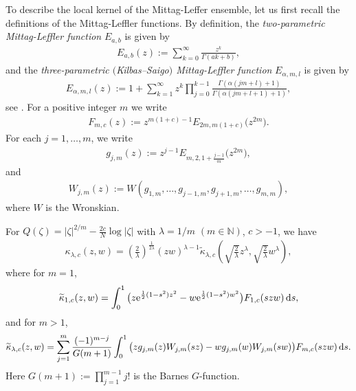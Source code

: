 To describe the local kernel of the Mittag-Leffer ensemble, let us first recall the definitions of the Mittag-Leffler functions. By definition, the \emph{two-parametric Mittag-Leffler function} $E_{a,b}$ is given by
\begin{gather} \label{ML function}
	E_{a,b}(z):=\sum_{k=0}^{\infty} \frac{z^k}{\Gamma(ak+b)},
\end{gather}
and the \emph{three-parametric $($Kilbas--Saigo$)$ Mittag-Leffler function} $E_{\alpha,m,l}$ is given by
\begin{gather} \label{ML3}
	E_{\alpha,m,l}(z):=1+\sum_{k=1}^\infty z^k \prod_{j=0}^{k-1} \frac{ \Gamma(\alpha(jm+l)+1) }{ \Gamma(\alpha(jm+l+1)+1) },
\end{gather}
see \cite[Chapters~4 and~5]{gorenflo2014mittag}.
For a positive integer $m$ we write
\begin{gather}\label{F integer}
	F_{m,c}(z):=z^{m(1+c)-1} E_{2m,m(1+c)}\big(z^{2m}\big).
\end{gather}
For each $j =1,\dots,m$, we write
\begin{gather} \label{m indep sol}
g_{j,m}(z):=z^{j-1} E_{m,2,1+\frac{j-1}{m}}\big(z^{2m}\big),
\end{gather}
and
\begin{gather} \label{W_j(z)}
W_{j,m}(z):=W( g_{1,m},\dots, g_{j-1,m}, g_{j+1,m}, \dots, g_{m,m} ),
\end{gather}
where $W$ is the Wronskian.

\begin{Theorem} \label{Thm_ML integer}
	For $Q(\zeta)=|\zeta|^{2/m}-\frac{2c}{N} \log|\zeta|$ with $\lambda=1/m$ $(m\in \mathbb{N})$, $c>-1$, we have
	\begin{gather*}
		\kappa_{\lambda,c}(z,w)=\left( \frac{2}{\lambda} \right)^{ \frac{1}{2\lambda} } (zw)^{\lambda-1} \widetilde{\kappa}_{\lambda,c} \left( \sqrt{ \frac{2}{\lambda} } z^\lambda, \sqrt{ \frac{2}{\lambda} } w^\lambda \right),
	\end{gather*}
	where for $m=1$,
	\begin{gather*}
	\widetilde{\kappa}_{1,c}(z,w)= \int_0^1 \big(z {\rm e}^{ \frac12 (1-s^2)z^2 } -w {\rm e}^{ \frac12 (1-s^2)w^2 }\big)F_{1,c}(szw)\,{\rm d}s,
	\end{gather*}
	and for $m>1$,
	\begin{gather*}
	\widetilde{\kappa}_{\lambda,c}(z,w)= \sum_{j=1}^{m} \frac{(-1)^{m-j}}{G(m+1)} \int_0^1 \big( z g_{j,m}(z)W_{j,m}(sz)-w g_{j,m}(w)W_{j,m}(sw)\big)F_{m,c}(szw)\,{\rm d}s.
	\end{gather*}
	Here $G(m+1):=\prod_{j=1}^{m-1} j!$ is the Barnes $G$-function.
\end{Theorem}
